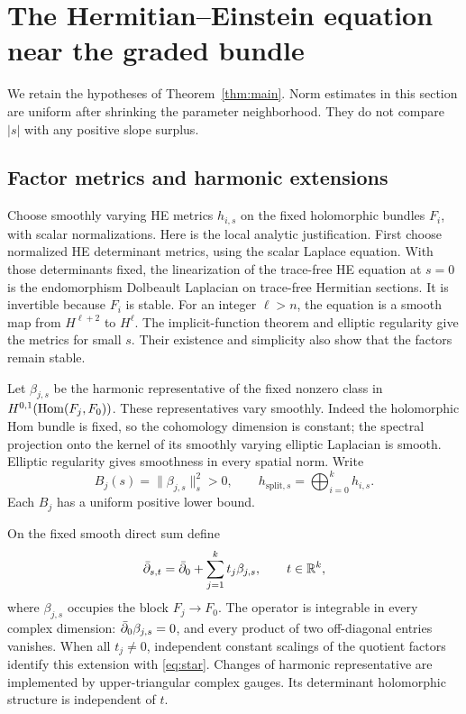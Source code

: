 \section{The Hermitian--Einstein equation near the graded bundle}
\label{sec:construction}

We retain the hypotheses of Theorem~\ref{thm:main}. Norm estimates in
this section are uniform after shrinking the parameter neighborhood.
They do not compare $|s|$ with any positive slope surplus.

\subsection{Factor metrics and harmonic extensions}
Choose smoothly varying HE metrics $h_{i,s}$ on the fixed holomorphic
bundles $F_i$, with scalar normalizations. Here is the local analytic
justification. First choose normalized HE determinant metrics, using
the scalar Laplace equation. With those determinants fixed, the
linearization of the trace-free HE equation at $s=0$ is the
endomorphism Dolbeault Laplacian on trace-free Hermitian sections.
It is invertible because $F_i$ is stable. For an integer $\ell>n$,
the equation is a smooth map from $H^{\ell+2}$ to $H^\ell$.
The implicit-function theorem and elliptic regularity give the
metrics for small $s$. Their existence and simplicity also show that
the factors remain stable.

Let $\beta_{j,s}$ be the harmonic representative of the fixed nonzero
class in $H^{0,1}(\operatorname{Hom}(F_j,F_0))$. These representatives vary
smoothly. Indeed the holomorphic Hom bundle is fixed, so the
cohomology dimension is constant; the spectral projection onto the
kernel of its smoothly varying elliptic Laplacian is smooth. Elliptic
regularity gives smoothness in every spatial norm. Write
\[
 B_j(s)=\|\beta_{j,s}\|_s^2>0,\qquad
 h_{\mathrm{split},s}=\bigoplus_{i=0}^kh_{i,s}.
\]
Each $B_j$ has a uniform positive lower bound.

On the fixed smooth direct sum define
\begin{equation}\label{eq:scaled-dbar}
 \bar\partial_{s,t}=\bar\partial_0+\sum_{j=1}^kt_j\beta_{j,s},
 \qquad t\in\mathbb R^k,
\end{equation}
where $\beta_{j,s}$ occupies the block $F_j\to F_0$.
The operator is integrable in every complex dimension:
$\bar\partial_0\beta_{j,s}=0$, and every product of two off-diagonal
entries vanishes. When all $t_j\ne0$, independent constant
scalings of the quotient factors identify this extension with
\eqref{eq:star}. Changes of harmonic representative are implemented
by upper-triangular complex gauges. Its determinant holomorphic
structure is independent of $t$.

